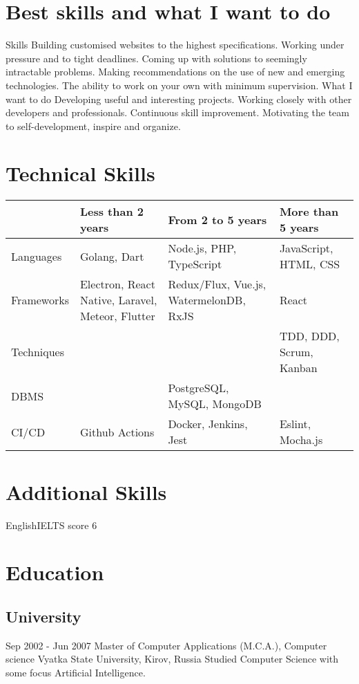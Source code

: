 \documentclass[11pt,a4paper]{moderncv}
\begin{document}
\maketitle
\section{Best skills and what I want to do}
  \cvline
    {Skills}{
      Building customised websites to the highest specifications.
      Working under pressure and to tight deadlines.
      Coming up with solutions to seemingly intractable problems.
      Making recommendations on the use of new and emerging technologies.
      The ability to work on your own with minimum supervision.}
  \cvline
    {What I want to do}{
      Developing useful and interesting projects.
      Working closely with other developers and professionals.
      Continuous skill improvement.
      Motivating the team to self-development, inspire and organize.}

\section{Technical Skills}

\begin{tabular}{ l||m{4cm}|m{4cm}|m{4cm}|  }
  & Less than 2 years & From 2 to 5 years & More than 5 years \\
  \hline\hline
  Languages & Golang, Dart & Node.js, PHP, TypeScript & JavaScript, HTML, CSS \\
  \hline
  Frameworks & Electron, React Native, Laravel, Meteor, Flutter & Redux/Flux, Vue.js, WatermelonDB, RxJS & React \\
  \hline
  Techniques & & & TDD, DDD, Scrum, Kanban \\
  \hline
  DBMS & & PostgreSQL, MySQL, MongoDB & \\
  \hline
  CI/CD & Github Actions & Docker, Jenkins, Jest & Eslint, Mocha.js \\
  \hline
\end{tabular}

\section{Additional Skills}
  \cvline
    {English}{IELTS score 6}

\section{Education}
  \subsection{University}
  \cventry
    {Sep 2002 - Jun 2007}
    {Master of Computer Applications (M.C.A.), Computer science}
    {\newline Vyatka State University, Kirov, Russia}
    {}{}
    {Studied Computer Science with some focus Artificial Intelligence.}
\end{document}
